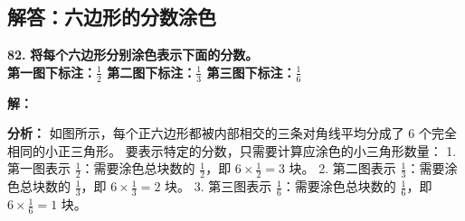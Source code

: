 \newpage

\newpage

\subsection{解答：六边形的分数涂色}

\vspace{0.6cm}

\textbf{\LARGE 82.} \textbf{将每个六边形分别涂色表示下面的分数。\\[1ex]
第一图下标注：$\displaystyle\frac{1}{2}$ \qquad 第二图下标注：$\displaystyle\frac{1}{3}$ \qquad 第三图下标注：$\displaystyle\frac{1}{6}$}

\vspace{0.4cm}
\textbf{解：}

\textbf{分析：}
如图所示，每个正六边形都被内部相交的三条对角线平均分成了 $6$ 个完全相同的小正三角形。
要表示特定的分数，只需要计算应涂色的小三角形数量：
1. 第一图表示 $\displaystyle\frac{1}{2}$：需要涂色总块数的 $\displaystyle\frac{1}{2}$，即 $6 \times \frac{1}{2} = 3$ 块。
2. 第二图表示 $\displaystyle\frac{1}{3}$：需要涂色总块数的 $\displaystyle\frac{1}{3}$，即 $6 \times \frac{1}{3} = 2$ 块。
3. 第三图表示 $\displaystyle\frac{1}{6}$：需要涂色总块数的 $\displaystyle\frac{1}{6}$，即 $6 \times \frac{1}{6} = 1$ 块。

